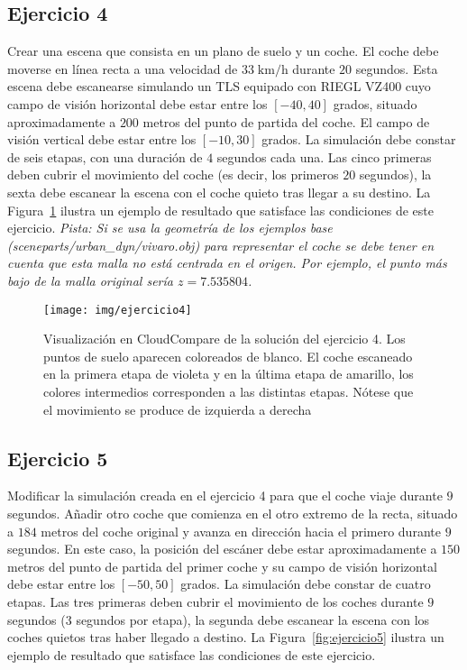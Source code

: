 \documentclass[]{article}
\begin{document}
	\pagebreak
	

	\subsection*{Ejercicio 4}
	Crear una escena que consista en un plano de suelo y un coche. El coche debe moverse en línea recta a una velocidad de $33 \;\mathrm{km}/\mathrm{h}$ durante $20$ segundos. Esta escena debe escanearse simulando un TLS equipado con RIEGL VZ400 cuyo campo de visión horizontal debe estar entre los $[-40, 40]$ grados, situado aproximadamente a $200$ metros del punto de partida del coche. El campo de visión vertical debe estar entre los $[-10, 30]$ grados. La simulación debe constar de seis etapas, con una duración de $4$ segundos cada una. Las cinco primeras deben cubrir el movimiento del coche (es decir, los primeros $20$ segundos), la sexta debe escanear la escena con el coche quieto tras llegar a su destino. La Figura~\ref{fig:ejercicio4} ilustra un ejemplo de resultado que satisface las condiciones de este ejercicio. \textit{Pista: Si se usa la geometría de los ejemplos base (sceneparts/urban\_dyn/vivaro.obj) para representar el coche se debe tener en cuenta que esta malla no está centrada en el origen. Por ejemplo, el punto más bajo de la malla original sería $z=7.535804$.}

	\begin{figure}[htb]
		\centering
		\texttt{[image: img/ejercicio4]}
		\caption{Visualización en CloudCompare de la solución del ejercicio 4. Los puntos de suelo aparecen coloreados de blanco. El coche escaneado en la primera etapa de violeta y en la última etapa de amarillo, los colores intermedios corresponden a las distintas etapas. Nótese que el movimiento se produce de izquierda a derecha}
		\label{fig:ejercicio4}
	\end{figure} 
	
	\pagebreak
	
	
	\subsection*{Ejercicio 5}
	Modificar la simulación creada en el ejercicio 4 para que el coche viaje durante $9$ segundos. Añadir otro coche que comienza en el otro extremo de la recta, situado a $184$ metros del coche original y avanza en dirección hacia el primero durante $9$ segundos. En este caso, la posición del escáner debe estar aproximadamente a $150$ metros del punto de partida del primer coche y su campo de visión horizontal debe estar entre los $[-50, 50]$ grados. La simulación debe constar de cuatro etapas. Las tres primeras deben cubrir el movimiento de los coches durante $9$ segundos ($3$ segundos por etapa), la segunda debe escanear la escena con los coches quietos tras haber llegado a destino. La Figura~\ref{fig:ejercicio5} ilustra un ejemplo de resultado que satisface las condiciones de este ejercicio.
	
\end{document}
